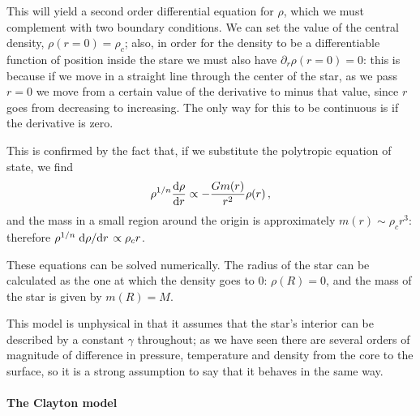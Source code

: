 \documentclass[main.tex]{subfiles}
\begin{document}
This will yield a second order differential equation for \(\rho \), which we must complement with two boundary conditions. 
We can set the value of the central density, \(\rho (r = 0) = \rho _c\); also, in order for the density to be a differentiable function of position inside the stare we must also have \(\partial_{r}\rho (r=0) = 0 \): this is because if we move in a straight line through the center of the star, as we pass \(r = 0\) we move from a certain value of the derivative to minus that value, since \(r\) goes from decreasing to increasing. The only way for this to be continuous is if the derivative is zero. 

This is confirmed by the fact that, if we substitute the polytropic equation of state, we find
%
%
%
\begin{align}
  \rho^{1/n} \dv{\rho }{r} \propto - \frac{Gm(r)}{r^2} \rho (r)
\,,
\end{align}
%
and the mass in a small region around the origin is approximately \(m(r) \sim \rho_c r^3\): therefore \(\rho^{1/n} \dv*{\rho }{r} \propto \rho _c r\). 

These equations can be solved numerically.
The radius of the star can be calculated as the one at which the density goes to 0: \(\rho (R) =0\), and the mass of the star is given by \(m(R) = M\). 

This model is unphysical in that it assumes that the star's interior can be described by a constant \(\gamma \) throughout; as we have seen there are several orders of magnitude of difference in pressure, temperature and density from the core to the surface, so it is a strong assumption to say that it behaves in the same way.

\paragraph{The Clayton model}
\end{document}

